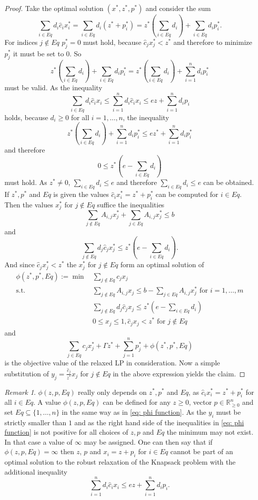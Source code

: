 \documentclass[titlepage, a4paper]{amsbook}
\theoremstyle{plain}
\theoremstyle{break}
\theoremstyle{definition}
\theoremstyle{remark}
\newtheorem{rem}[thm]{Remark}
\numberwithin{equation}{thm}
\begin{document}
\begin{proof}
Take the optimal solution $(x^*,z^*,p^*)$ and consider the sum
\[\sum_{i \in Eq} d_i \hat{c}_i x^*_i = \sum_{i \in Eq} d_i (z^*+p^*_i) = z^*(\sum_{i \in Eq} d_i) + \sum_{i \in Eq} d_i p^*_i.\]
For indices $j \notin Eq$ $p^*_j=0$ must hold, because $\hat{c}_j x^*_j < z^*$ and therefore to minimize $p^*_j$ it must be set to $0$.
So 
\[z^*(\sum_{i \in Eq} d_i) + \sum_{i \in Eq} d_i p^*_i= z^*(\sum_{i \in Eq} d_i) + \sum_{i=1}^n d_i p^*_i\]
must be valid. As the inequality 
\[\sum_{i \in Eq} d_i \hat{c}_i x_i \leq \sum_{i=1}^n d_i \hat{c}_i x_i \leq e z + \sum_{i=1}^n d_i p_i\]
holds, because $d_i \geq 0$ for all $i=1, \ldots, n$, the inequality
\[ z^*(\sum_{i \in Eq} d_i) + \sum_{i=1}^n d_i p^*_i \leq e z^* + \sum_{i=1}^n d_i p^*_i\]
and therefore
\[0 \leq z^*(e - \sum_{i \in Eq} d_i)\]
must hold. As $z^* \neq 0$, $\sum_{i \in Eq} d_i \leq e$ and therefore $\sum_{i \in Eq} d_i \leq e$ can be obtained.
If $z^*, p^*$ and $Eq$ is given the values $\hat{c}_ix^*_i=z^*+p^*_i$ can be computed for $i \in Eq$. Then the values $x^*_j$ for $j \notin Eq$ suffice the inequalities
\[\sum_{j \notin Eq}A_{i,j}x^*_j + \sum_{j \in Eq}A_{i,j}x^*_j \leq b\]
and 
\[\sum_{j \notin Eq}d_j \hat{c}_j x^*_j \leq z^*(e-\sum_{i \in Eq}d_i).\]
And since $\hat{c}_j x^*_j < z^*$ the $x^*_j$ for $j \notin Eq$ form an optimal solution of 
\begin{equation*}
\begin{split}
\phi(z^*, p^*, Eq):=\min\, &\sum_{j \notin Eq}c_j x_j \\
\text{s.t. }&\sum_{j \notin Eq}A_{i,j}x_j \leq b-\sum_{j \in Eq}A_{i,j}x^*_j \text{ for }i=1, \ldots, m\\
&\sum_{j \notin Eq}d_j\hat{c}_j x_j \leq z^*(e - \sum_{i \in Eq}d_i) \\
&0 \leq x_j \leq 1,  \hat{c}_j x_j < z^* \text{ for }j \notin Eq
\end{split}
\end{equation*}
and 
\[\sum_{j \in Eq}c_j x^*_j + \Gamma z^* + \sum_{j=1}^n p^*_j + \phi(z^*, p^*, Eq)\]
is the objective value of the relaxed LP in consideration. 
Now a simple substitution of $y_j=\frac{\hat{c}_j}{z^*}x_j$ for $j \notin Eq$ in the above expression yields the claim.
\end{proof}
\begin{rem}
$\phi(z, p, Eq)$ really only depends on $z^*, p^*$ and $Eq$, as $\hat{c}_ix^*_i=z^* + p^*_i$ for all $i \in Eq$. 
A value $\phi(z, p, Eq)$ can be defined for any $z \geq 0$, vector $p \in \mathbb{R}_{\geq 0}^n$ and set $Eq \subseteq \{1, \ldots, n\}$ in the same way as in \eqref{eq: phi function}. As the $y_i$ must be strictly smaller than $1$ and as the right hand side of the inequalities in \eqref{eq: phi function} is not positive for all choices of $z, p$ and $Eq$ the minimum may not exist. In that case a value of $\infty$ may be assigned. One can then say that if $\phi(z, p, Eq) = \infty$ then $z$, $p$ and $x_i=z+p_i$ for $i \in Eq$ cannot be part of an optimal solution to the robust relaxation of the Knapsack problem with the additional inequality 
\[\sum_{i=1}^n d_i \hat{c}_i x_i \leq e z + \sum_{i=1}^n d_i p_i.\]
\end{rem}
\end{document}
